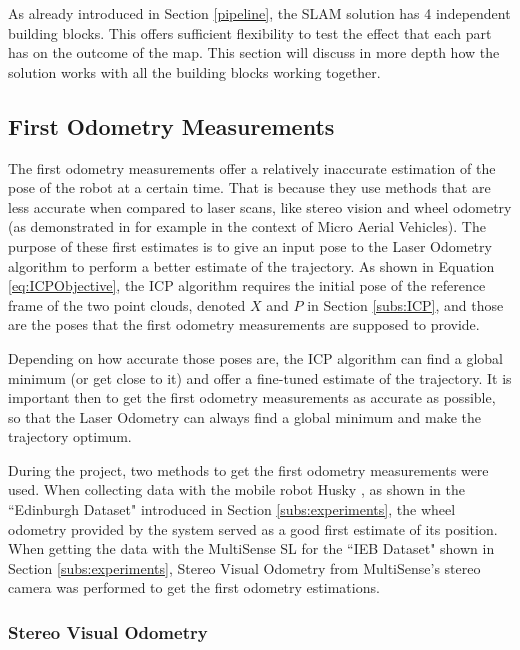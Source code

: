 \documentclass[11pt]{article}
\begin{document}
As already introduced in Section \ref{pipeline}, the SLAM solution has 4 independent building blocks. This offers sufficient flexibility to test the effect that each part has on the outcome of the map. This section will discuss in more depth how the solution works with all the building blocks working together. 
	 
	\subsection{First Odometry Measurements}

The first odometry measurements offer a relatively inaccurate estimation of the pose of the robot at a certain time. That is because they use methods that are less accurate when compared to laser scans, like stereo vision and wheel odometry (as demonstrated in \cite{achtelik2009stereo} for example in the context of Micro Aerial Vehicles). The purpose of these first estimates is to give an input pose to the Laser Odometry algorithm to perform a better estimate of the trajectory. As shown in Equation \ref{eq:ICPObjective}, the ICP algorithm requires the initial pose of the reference frame of the two point clouds, denoted $X$ and $P$ in Section \ref{subs:ICP}, and those are the poses that the first odometry measurements are supposed to provide.

Depending on how accurate those poses are, the ICP algorithm can find a global minimum (or get close to it) and offer a fine-tuned estimate of the trajectory. It is important then to get the first odometry measurements as accurate as possible, so that the Laser Odometry can always find a global minimum and make the trajectory optimum.
	
During the project, two methods to get the first odometry measurements were used. When collecting data with the mobile robot Husky \cite{Husky}, as shown in the ``Edinburgh Dataset" introduced in Section \ref{subs:experiments}, the wheel odometry provided by the system served as a good first estimate of its position. When getting the data with the MultiSense SL \cite{multisense} for the ``IEB Dataset" shown in Section \ref{subs:experiments}, Stereo Visual Odometry from MultiSense's stereo camera was performed to get the first odometry estimations.
	
	\subsubsection*{Stereo Visual Odometry}
\end{document}
